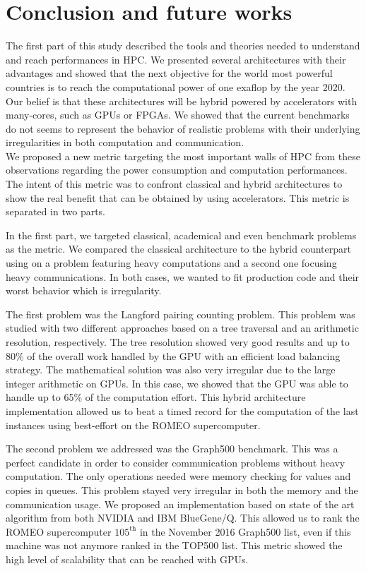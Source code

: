 \chapter*{Conclusion and future works}
The first part of this study described the tools and theories needed to understand and reach performances in HPC. 
We presented several architectures with their advantages and showed that the next objective for the world most powerful countries is to reach the computational power of one exaflop by the year 2020. 
Our belief is that these architectures will be hybrid powered by accelerators with many-cores, such as GPUs or FPGAs. 
We showed that the current benchmarks do not seems to represent the behavior of realistic problems with their underlying irregularities in both computation and communication.\\

We proposed a new metric targeting the most important walls of HPC from these observations regarding the power consumption and computation performances.
The intent of this metric was to confront classical and hybrid architectures to show the real benefit that can be obtained by using accelerators. 
This metric is separated in two parts. 

In the first part, we targeted classical, academical and even benchmark problems as the metric. 
We compared the classical architecture to the hybrid counterpart using on a problem featuring heavy computations and a second one focusing heavy communications. 
In both cases, we wanted to fit production code and their worst behavior which is irregularity. 

The first problem was the Langford pairing counting problem. 
This problem was studied with two different approaches based on a tree traversal and an arithmetic resolution, respectively. 
The tree resolution showed very good results and up to 80\% of the overall work handled by the GPU with an efficient load balancing strategy. 
The mathematical solution was also very irregular due to the large integer arithmetic on GPUs. 
In this case, we showed that the GPU was able to handle up to 65\% of the computation effort. 
This hybrid architecture implementation allowed us to beat a timed record for the computation of the last instances using best-effort on the ROMEO supercomputer. 

The second problem we addressed was the Graph500 benchmark. 
This was a perfect candidate in order to consider communication problems without heavy computation. 
The only operations needed were memory checking for values and copies in queues. 
This problem stayed very irregular in both the memory and the communication usage. 
We proposed an implementation based on state of the art algorithm from both NVIDIA and IBM BlueGene/Q. 
This allowed us to rank the ROMEO supercomputer $105^{\text{th}}$ in the November 2016 Graph500 list, even if this machine was not anymore ranked in the TOP500 list. 
This metric showed the high level of scalability that can be reached with GPUs.\\

